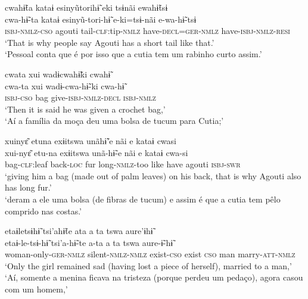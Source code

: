 \documentclass[output=paper,
modfonts,nonflat
]{langsci/langscibook}
\begin{document}
\ea cwahɨ̃ta kataɨ esinyũtorihɨ̃ eki	tsɨnãi	ewahɨ̃tsɨ\\[.3em]
\gll cwa-hɨ̃-ta		kataɨ	esinyũ-tori-hɨ̃		e-ki=tsɨ-nãi			e-wa-hɨ̃-tsɨ\\
\textsc{isbj-nmlz-cso}	agouti	tail-\textsc{clf}:tip-\textsc{nmlz}	have-\textsc{decl=ger-nmlz}	have-\textsc{isbj-nmlz-resi}\\
\glt ‘That is why people say Agouti has a short tail like that.’\\
‘Pessoal conta que é por isso que a cutia tem um rabinho curto assim.'
\z

\ea cwata xui wadɨcwahɨ̃ki cwahɨ̃ \\[.3em]
\gll cwa-ta		xui		wadɨ-cwa-hɨ̃-ki		cwa-hɨ̃	\\
\textsc{isbj-cso}		bag	give-\textsc{isbj-nmlz-decl}		\textsc{isbj-nmlz}\\
\glt ‘Then it is said he was given a crochet bag,’{\footnotemark}\\
‘Aí a família da moça deu uma bolsa de tucum para Cutia;'
\z

\ea xuinyɛ͂ etuna exɨitswa unãhɨ̃'e nãi e kataɨ cwasi\\[.3em]
\gll xui-nyɛ͂			etu-na		exɨitswa	unã-hɨ̃-e		nãi		e		kataɨ	cwa-si\\
bag-\textsc{clf}:leaf	back-\textsc{loc}	fur			long-\textsc{nmlz}-too	like	have	agouti	\textsc{isbj-swr}\\
\glt ‘giving him a bag (made out of palm leaves) on his back, that is why Agouti also has long fur.’\\
‘deram a ele uma bolsa (de fibras de tucum) e assim é que a cutia tem pêlo comprido nas costas.'
\z

\newpage 
\ea etaɨletsɨhɨ̃ tsi'ahɨ̃te ata a ta tswa aure'ɨhɨ̃\\[.3em] 
\gll etaɨ-le-tsɨ-hɨ̃				tsi'a-hɨ̃-te			a-ta		a		ta		tswa	aure-ɨ̃-hɨ̃\\
woman-only-\textsc{ger-nmlz}	silent-\textsc{nmlz-nmlz}	exist-\textsc{cso}	exist	\textsc{cso}	man	marry-\textsc{att-nmlz}\\
\glt ‘Only the girl remained sad (having lost a piece of herself), married to a man,’\\
‘Aí, somente a menina ficava na tristeza (porque perdeu um pedaço), agora casou com um homem,'
\z
\end{document}
